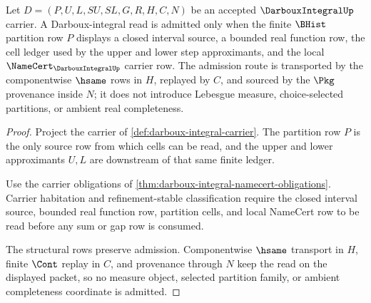 \begin{theorem}
\label{thm:darboux-integral-partition-carrier-admission}
Let $D=(P,U,L,SU,SL,G,R,H,C,N)$ be an accepted $\DarbouxIntegralUp$ carrier. A Darboux-integral read is admitted only when the finite $\BHist$ partition row $P$ displays a closed interval source, a bounded real function row, the cell ledger used by the upper and lower step approximants, and the local $\NameCert_{\DarbouxIntegralUp}$ carrier row. The admission route is transported by the componentwise $\hsame$ rows in $H$, replayed by $C$, and sourced by the $\Pkg$ provenance inside $N$; it does not introduce Lebesgue measure, choice-selected partitions, or ambient real completeness.
\end{theorem}
\begin{proof}
Project the carrier of \autoref{def:darboux-integral-carrier}. The partition row $P$ is the only source row from which cells can be read, and the upper and lower approximants $U,L$ are downstream of that same finite ledger.

Use the carrier obligations of \autoref{thm:darboux-integral-namecert-obligations}. Carrier habitation and refinement-stable classification require the closed interval source, bounded real function row, partition cells, and local NameCert row to be read before any sum or gap row is consumed.

The structural rows preserve admission. Componentwise $\hsame$ transport in $H$, finite $\Cont$ replay in $C$, and provenance through $N$ keep the read on the displayed packet, so no measure object, selected partition family, or ambient completeness coordinate is admitted.
\end{proof}

